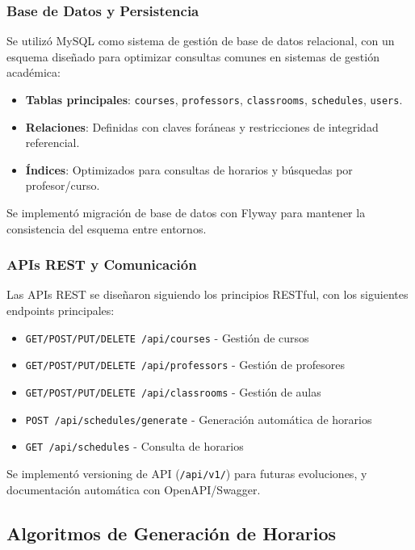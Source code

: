\subsubsection{Base de Datos y Persistencia}

Se utilizó MySQL como sistema de gestión de base de datos relacional, con un esquema diseñado para optimizar consultas comunes en sistemas de gestión académica:

\begin{itemize}
\item \textbf{Tablas principales}: \texttt{courses}, \texttt{professors}, \texttt{classrooms}, \texttt{schedules}, \texttt{users}.
\item \textbf{Relaciones}: Definidas con claves foráneas y restricciones de integridad referencial.
\item \textbf{Índices}: Optimizados para consultas de horarios y búsquedas por profesor/curso.
\end{itemize}

Se implementó migración de base de datos con Flyway para mantener la consistencia del esquema entre entornos.

\subsubsection{APIs REST y Comunicación}

Las APIs REST se diseñaron siguiendo los principios RESTful, con los siguientes endpoints principales:

\begin{itemize}
\item \texttt{GET/POST/PUT/DELETE /api/courses} - Gestión de cursos
\item \texttt{GET/POST/PUT/DELETE /api/professors} - Gestión de profesores
\item \texttt{GET/POST/PUT/DELETE /api/classrooms} - Gestión de aulas
\item \texttt{POST /api/schedules/generate} - Generación automática de horarios
\item \texttt{GET /api/schedules} - Consulta de horarios
\end{itemize}

Se implementó versioning de API (\texttt{/api/v1/}) para futuras evoluciones, y documentación automática con OpenAPI/Swagger.

\subsection{Algoritmos de Generación de Horarios}


